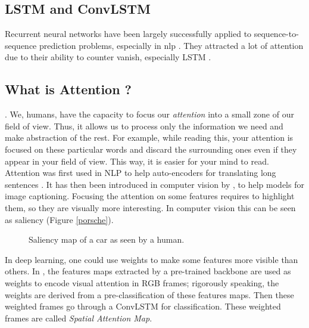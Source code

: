 \documentclass[12pt, a4paper]{report}
\begin{document}
			\subsection{LSTM and ConvLSTM}\label{lstm_convlstm}
				Recurrent neural networks have been largely successfully applied to sequence-to-sequence prediction problems, especially in \gls{nlp} \cite{wu2016google,shen2018natural,miao2020application}.
				They attracted a lot of attention due to their ability to counter \gls{vanish}, especially LSTM \cite{Hochreiter1997lstm}.

			\subsection{What is Attention ?}
				 \cite{sudhakaran2019lsta}.
				We, humans, have the capacity to focus our {\itshape attention} into a small zone of our field of view.
				Thus, it allows us to process only the information we need and make abstraction of the rest.
				For example, while reading this, your attention is focused on these particular words and discard the surrounding ones even if they appear in your field of view.
				This way, it is easier for your mind to read.
				Attention was first used in NLP to help auto-encoders for translating long sentences \cite{bahdanau2014neural}.
				It has then been introduced in computer vision by \cite{xu2015show}, to help models for image captioning.
				Focusing the attention on some features requires to highlight them, so they are visually more interesting.
				In computer vision this can be seen as \gls{saliency} (Figure \ref{porsche}).
				\begin{figure}[h!]
					\centering
					\caption{Saliency map of a car as seen by a human.}
				\end{figure}
				In deep learning, one could use weights to make some features more visible than others.
				In \cite{sudhakaran2018attention}, the features maps extracted by a pre-trained backbone are used as weights to encode visual attention in RGB frames; rigorously speaking, the weights are derived from a pre-classification of these features maps.
				Then these weighted frames go through a ConvLSTM for classification.
				These weighted frames are called {\itshape Spatial Attention Map}.
\end{document}
